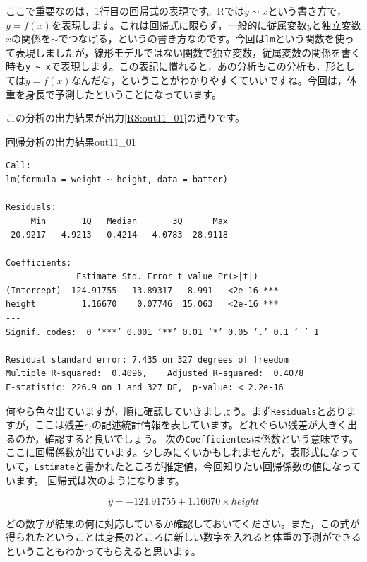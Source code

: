 \documentclass{ltjbook}
\begin{document}
ここで重要なのは，1行目の回帰式の表現です。Rでは$y\sim x $という書き方で，$y=f(x)$を表現します。これは回帰式に限らず，一般的に従属変数$y$と独立変数$x$の関係を$\sim$でつなげる，というの書き方なのです。今回は\texttt{lm}という関数を使って表現しましたが，線形モデルではない関数で独立変数，従属変数の関係を書く時も\verb|y ~ x|で表現します。この表記に慣れると，あの分析もこの分析も，形としては$y=f(x)$なんだな，ということがわかりやすくていいですね。今回は，体重を身長で予測したということになっています。

この分析の出力結果が出力\ref{RS:out11_01}の通りです。

\begin{Rscreen}{回帰分析の出力結果}{out11_01}
    \begin{verbatim}
Call:
lm(formula = weight ~ height, data = batter)

Residuals:
     Min       1Q   Median       3Q      Max 
-20.9217  -4.9213  -0.4214   4.0783  28.9118 

Coefficients:
              Estimate Std. Error t value Pr(>|t|)    
(Intercept) -124.91755   13.89317  -8.991   <2e-16 ***
height         1.16670    0.07746  15.063   <2e-16 ***
---
Signif. codes:  0 ‘***’ 0.001 ‘**’ 0.01 ‘*’ 0.05 ‘.’ 0.1 ‘ ’ 1

Residual standard error: 7.435 on 327 degrees of freedom
Multiple R-squared:  0.4096,	Adjusted R-squared:  0.4078 
F-statistic: 226.9 on 1 and 327 DF,  p-value: < 2.2e-16
    \end{verbatim}
\end{Rscreen}

何やら色々出ていますが，順に確認していきましょう。まず\texttt{Residuals}とありますが，ここは残差$e_i$の記述統計情報を表しています。どれぐらい残差が大きく出るのか，確認すると良いでしょう。
次の\texttt{Coefficientes}は係数という意味です。ここに回帰係数が出ています。少しみにくいかもしれませんが，表形式になっていて，\texttt{Estimate}と書かれたところが推定値，今回知りたい回帰係数の値になっています。
回帰式は次のようになります。

\[ \hat{y} = -124.91755 + 1.16670 \times height \]

どの数字が結果の何に対応しているか確認しておいてください。また，この式が得られたということは身長のところに新しい数字を入れると体重の予測ができるということもわかってもらえると思います。
\end{document}
